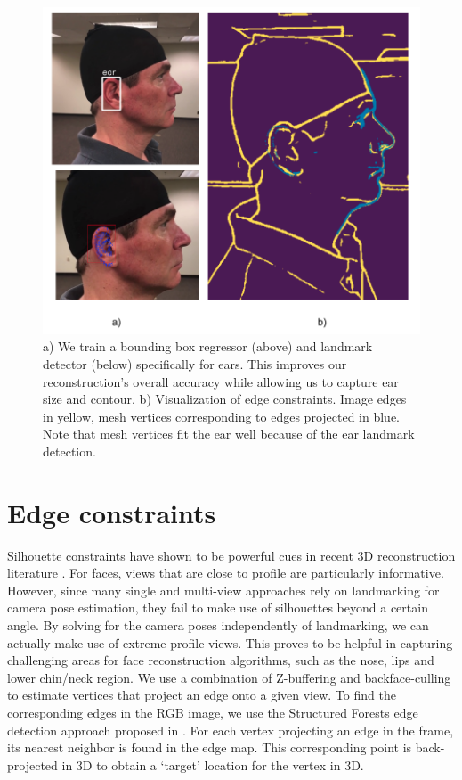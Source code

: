 \begin{figure}[t]
\begin{center}
   \includegraphics[width=0.8\linewidth]{images/ear_lm_and_edges.png}
\end{center}
   \caption{ a) We train a bounding box regressor (above) and landmark detector (below) specifically for ears. This improves our reconstruction's overall accuracy while allowing us to capture ear size and contour. b) Visualization of edge constraints. Image edges in yellow, mesh vertices corresponding to edges projected in blue. Note that mesh vertices fit the ear well because of the ear landmark detection. }
\label{fig:ear_lm_and_edges}
\end{figure}





\section{Edge constraints}
Silhouette constraints have shown to be powerful cues in recent 3D reconstruction literature \cite{alldieck2018detailed,bas2016fitting}. For faces, views that are close to profile are particularly informative. However, since many single and multi-view approaches rely on landmarking for camera pose estimation, they fail to make use of silhouettes beyond a certain angle. By solving for the camera poses independently of landmarking, we can actually make use of extreme profile views. This proves to be helpful in capturing challenging areas for face reconstruction algorithms, such as the nose, lips and lower chin/neck region.
We use a combination of Z-buffering \cite{Foley1990ComputerG} and backface-culling  to estimate vertices that project an edge onto a given view. To find the corresponding edges in the RGB image, we use the Structured Forests edge detection approach proposed in \cite{dollar2013structured}. For each vertex projecting an edge in the frame, its nearest neighbor is found in the edge map. This corresponding point is back-projected in 3D to obtain a `target' location for the vertex in 3D.


